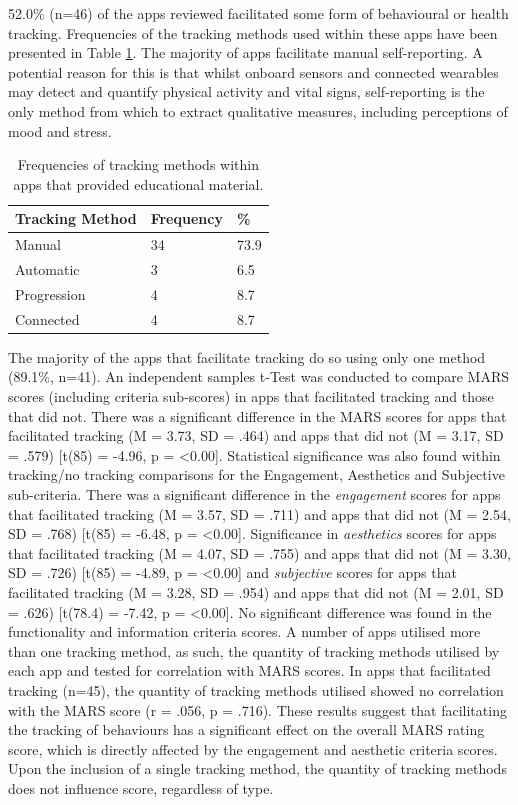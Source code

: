52.0\% (n=46) of the apps reviewed facilitated some form of behavioural or health tracking. Frequencies of the tracking methods used within these apps have been presented in Table \ref{tbl: trackingtype-frequencies}. The majority of apps facilitate manual self-reporting. A potential reason for this is that whilst onboard sensors and connected wearables may detect and quantify physical activity and vital signs, self-reporting is the only method from which to extract qualitative measures, including perceptions of mood and stress.

\begin{table}[h]
\centering
\caption{Frequencies of tracking methods within apps that provided educational material.}
\label{tbl: trackingtype-frequencies}
\begin{tabular}{@{}lll@{}}
\toprule
Tracking Method & Frequency & \% \\ \midrule
Manual & 34 & 73.9 \\
Automatic & 3 & 6.5 \\
Progression & 4 & 8.7 \\
Connected & 4 & 8.7 \\ \bottomrule
\end{tabular}
\end{table}

The majority of the apps that facilitate tracking do so using only one method (89.1\%, n=41). An independent samples t-Test was conducted to compare MARS scores (including criteria sub-scores) in apps that facilitated tracking and those that did not. There was a significant difference in the MARS scores for apps that facilitated tracking (M = 3.73, SD = .464) and apps that did not (M = 3.17, SD = .579) [t(85) = -4.96, p = \textless0.00].
Statistical significance was also found within tracking/no tracking comparisons for the Engagement, Aesthetics and Subjective sub-criteria.
\newline There was a significant difference in the \textit{engagement} scores for apps that facilitated tracking (M = 3.57, SD = .711) and apps that did not (M = 2.54, SD = .768) [t(85) = -6.48, p = \textless0.00]. Significance in \textit{aesthetics} scores for apps that facilitated tracking (M = 4.07, SD = .755) and apps that did not (M = 3.30, SD = .726) [t(85) = -4.89, p = \textless0.00] and \textit{subjective} scores for apps that facilitated tracking (M = 3.28, SD = .954) and apps that did not (M = 2.01, SD = .626) [t(78.4) = -7.42, p = \textless0.00]. No significant difference was found in the functionality and information criteria scores.
A number of apps utilised more than one tracking method, as such, the quantity of tracking methods utilised by each app and tested for correlation with MARS scores. In apps that facilitated tracking (n=45), the quantity of tracking methods utilised showed no correlation with the MARS score (r = .056, p = .716).
These results suggest that facilitating the tracking of behaviours has a significant effect on the overall MARS rating score, which is directly affected by the engagement and aesthetic criteria scores. Upon the inclusion of a single tracking method, the quantity of tracking methods does not influence score, regardless of type.


